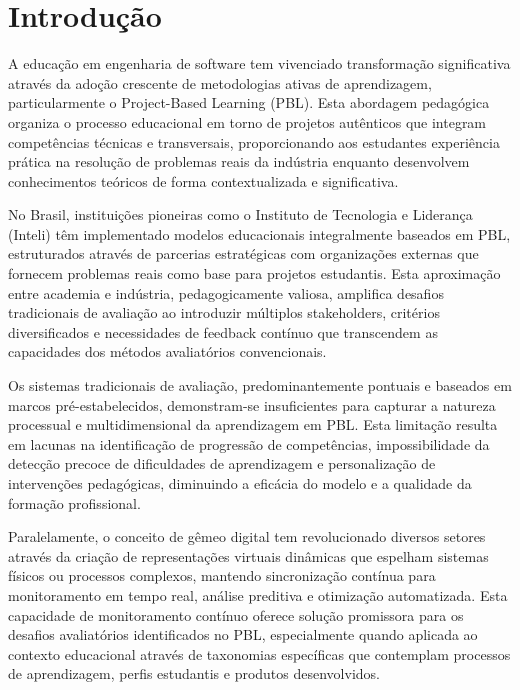 \documentclass[english, spanish, brazilian]{RBIEarticle} %
\begin{document}
\pagebreak


\section{Introdução}

A educação em engenharia de software tem vivenciado transformação significativa
através da adoção crescente de metodologias ativas de aprendizagem,
particularmente o Project-Based Learning (PBL). Esta abordagem pedagógica
organiza o processo educacional em torno de projetos autênticos que integram
competências técnicas e transversais, proporcionando aos estudantes experiência
prática na resolução de problemas reais da indústria enquanto desenvolvem
conhecimentos teóricos de forma contextualizada e significativa.

No Brasil, instituições pioneiras como o Instituto de Tecnologia e Liderança
(Inteli) têm implementado modelos educacionais integralmente baseados em PBL,
estruturados através de parcerias estratégicas com organizações externas que
fornecem problemas reais como base para projetos estudantis. Esta aproximação
entre academia e indústria, pedagogicamente valiosa, amplifica desafios
tradicionais de avaliação ao introduzir múltiplos stakeholders, critérios
diversificados e necessidades de feedback contínuo que transcendem as
capacidades dos métodos avaliatórios convencionais.

Os sistemas tradicionais de avaliação, predominantemente pontuais e baseados em
marcos pré-estabelecidos, demonstram-se insuficientes para capturar a natureza
processual e multidimensional da aprendizagem em PBL. Esta limitação resulta em
lacunas na identificação de progressão de competências, impossibilidade da
detecção precoce de dificuldades de aprendizagem e personalização de
intervenções pedagógicas, diminuindo a eficácia do modelo e a qualidade da
formação profissional.

Paralelamente, o conceito de gêmeo digital tem revolucionado diversos setores
através da criação de representações virtuais dinâmicas que espelham sistemas
físicos ou processos complexos, mantendo sincronização contínua para
monitoramento em tempo real, análise preditiva e otimização automatizada. Esta
capacidade de monitoramento contínuo oferece solução promissora para os
desafios avaliatórios identificados no PBL, especialmente quando aplicada ao
contexto educacional através de taxonomias específicas que contemplam processos
de aprendizagem, perfis estudantis e produtos desenvolvidos.
\end{document}
